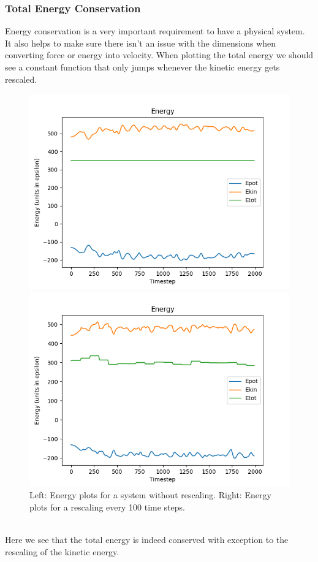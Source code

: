 \documentclass[a4paper,12pt]{article} %
\begin{document}
\subsubsection{Total Energy Conservation}
Energy conservation is a very important requirement to have a physical system. It also helps to make sure there isn't an issue with the dimensions when converting force or energy into velocity. When plotting the total energy we should see a constant function that only jumps whenever the kinetic energy gets rescaled.\\
\begin{figure}[!h]
\centering
\begin{minipage}{.5\textwidth}
  \centering
  \includegraphics[width=0.95\linewidth]{Data/energy.png}
\end{minipage}%
\begin{minipage}{.5\textwidth}
  \centering
  \includegraphics[width=0.95\linewidth]{Data/energyrescale.png}

\end{minipage}
\caption{Left: Energy plots for a system without rescaling. Right: Energy plots for a rescaling every 100 time steps.}
\end{figure}\\
Here we see that the total energy is indeed conserved with exception to the rescaling of the kinetic energy.  
\end{document}
